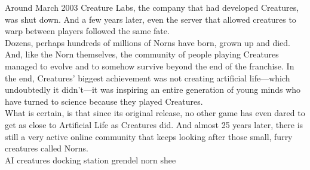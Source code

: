 \documentclass[11pt,twoside,a4paper]{article}
\begin{document}
Around March 2003 Creature Labs, the company that had developed Creatures, was shut down. And a few years later, even the server that allowed creatures to warp between players followed the same fate.~\\

Dozens, perhaps hundreds of millions of Norns have born, grown up and died. And, like the Norn themselves, the community of people playing Creatures managed to evolve and to somehow survive beyond the end of the franchise. In the end, Creatures’ biggest achievement was not creating artificial life—which undoubtedly it didn’t—it was inspiring an entire generation of young minds who have turned to science because they played Creatures.~\\

What is certain, is that since its original release, no other game has even dared to get as close to Artificial Life as Creatures did. And almost 25 years later, there is still a very active online community that keeps looking after those small, furry creatures called Norns.~\\

AI  creatures  docking station  grendel  norn  shee
\end{document}
